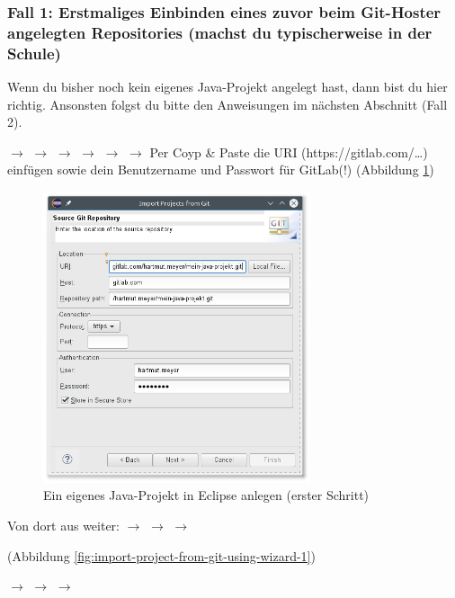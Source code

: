 \subsubsection{Fall 1: Erstmaliges Einbinden eines zuvor beim Git-Hoster
angelegten Repositories (machst du typischerweise in der Schule)}

Wenn du bisher noch kein eigenes Java-Projekt angelegt hast, dann bist du hier
richtig. Ansonsten folgst du bitte den Anweisungen im nächsten Abschnitt
(Fall 2).

 $\rightarrow$  $\rightarrow$ 
$\rightarrow$  $\rightarrow$  $\rightarrow$
 $\rightarrow$  Per Coyp \& Paste die URI
(https://gitlab.com/\ldots) einfügen sowie dein Benutzername und Passwort für
GitLab(!) (Abbildung \ref{fig:import-project-from-git})

\begin{figure}[h]
  \centering
   \includegraphics[width=0.70\textwidth]{./inf/SEKII/01_Vorbereitung/Import_Project_from_Git.png}
   \caption{Ein eigenes Java-Projekt in Eclipse anlegen (erster Schritt)}
   \label{fig:import-project-from-git}
\end{figure}

Von dort aus weiter: $\rightarrow$  $\rightarrow$ 
$\rightarrow$  

(Abbildung \ref{fig:import-project-from-git-using-wizard-1})

$\rightarrow$  $\rightarrow$  $\rightarrow$

